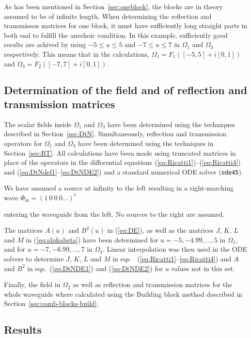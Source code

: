 \documentclass[numreferences]{kluwer}
\renewcommand{\Phi}{\varPhi}
\renewcommand{\vec}[1]{\bm{#1}}
\renewcommand{\Phi}{\varPhi}
\begin{document}
As has been mentioned in Section~\ref{sec:oneblock}, the blocks are in
theory assumed to be of infinite length. When determining the
reflection and transmisson matrices for one block, it must have
sufficiently long straight parts in both end to fulfill the anechoic
condition. In this example, sufficiently good results are achived by
using $-5\le u\le5$ and $-7\le u\le7$ in $\Omega_1$ and $\Omega_3$
respectively. This means that in the calculations,
$\Omega_1=F_1([-5,5]+i[0,1])$ and $\Omega_3=F_2([-7,7]+i[0,1])$.

\subsection{Determination of the field and of reflection and 
transmission matrices}
\label{sec:determ-field-refl}

The scalar fields inside $\Omega_1$ and $\Omega_3$ have been
determined using the techniques described in
Section~\ref{sec:DtN}. Simultaneously, reflection and transmission
operators for $\Omega_1$ and $\Omega_3$ have been determined using the
techniques in Section~\ref{sec:RT}. All calculations have been made
using %
truncated matrices in place of the operators in the
differential equations (\ref{eq:Ricatti1})--(\ref{eq:Ricatti4}) and
(\ref{eq:DtNdef1}--\ref{eq:DtNDE2}) and a standard numerical ODE
solver (\verb+ode45+).

We have assumed a source at infinity to the left resulting in a
right-marching wave $\vec\Phi_{\text{in}}=(1\ 0\ 0\ 0\dots)^t$

entering the waveguide from the left. No sources to the right are
assumed.

The matrices $A(u)$ and $B^2(u)$ in (\ref{eq:DE}), as well as the
matrices $J$, $K$, $L$ and $M$ in (\ref{eq:alphabeta}) have been
determined for $u=-5,-4.99,...,5$ in $\Omega_1$, and for
$u=-7,-6.99,...,7$ in $\Omega_3$. Linear interpolation was then used
in the ODE solvers to determine $J$, $K$, $L$ and $M$ in
eqs. ~(\ref{eq:Ricatti1}--\ref{eq:Ricatti4}) and $A$ and $B^2$ in
eqs.~(\ref{eq:DtNDE1}) and (\ref{eq:DtNDE2}) for $u$ values not in
this set.

Finally, the field in $\Omega_2$ as well as reflection and
transmission matrices for the whole waveguide where calculated using
the Building block method described in
Section~\ref{sec:comb-blocks-build}.

\subsection{Results}
\label{sec:results}
\end{document}
